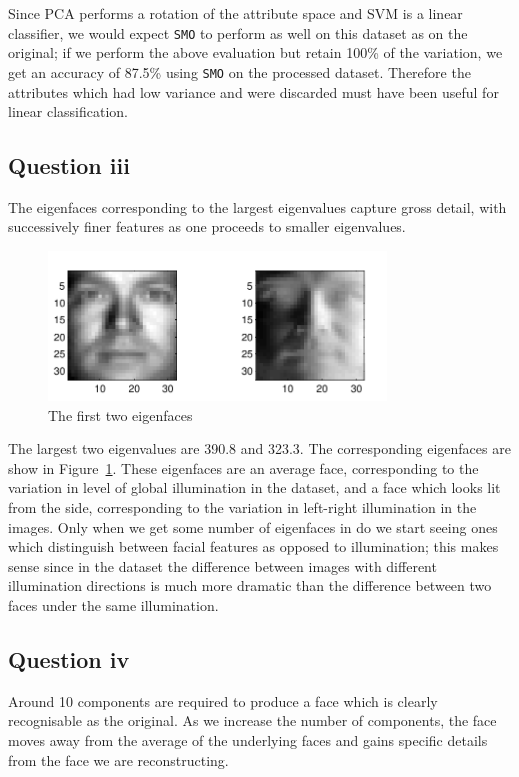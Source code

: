\documentclass[a4paper]{article}
\begin{document}
Since PCA performs a rotation of the attribute space and SVM is a linear classifier, we would expect {\tt SMO} to perform as well on this dataset as on the original; if we perform the above evaluation but retain 100\% of the variation, we get an accuracy of 87.5\% using {\tt SMO} on the processed dataset. Therefore the attributes which had low variance and were discarded must have been useful for linear classification.

\subsection*{Question iii}

The eigenfaces corresponding to the largest eigenvalues capture gross detail, with successively finer features as one proceeds to smaller eigenvalues.

\begin{figure}[!htbp]
\centering
\includegraphics[width=0.8\textwidth]{C3-img1-eigfaces-cropped.pdf}
\caption{The first two eigenfaces}
\label{fig:c3img1}
\end{figure}

The largest two eigenvalues are 390.8 and 323.3. The corresponding eigenfaces are show in Figure~\ref{fig:c3img1}. These eigenfaces are an average face, corresponding to the variation in level of global illumination in the dataset, and a face which looks lit from the side, corresponding to the variation in left-right illumination in the images. Only when we get some number of eigenfaces in do we start seeing ones which distinguish between facial features as opposed to illumination; this makes sense since in the dataset the difference between images with different illumination directions is much more dramatic than the difference between two faces under the same illumination.

\FloatBarrier

\subsection*{Question iv}
Around 10 components are required to produce a face which is clearly recognisable as the original. As we increase the number of components, the face moves away from the average of the underlying faces and gains specific details from the face we are reconstructing.
\end{document}
